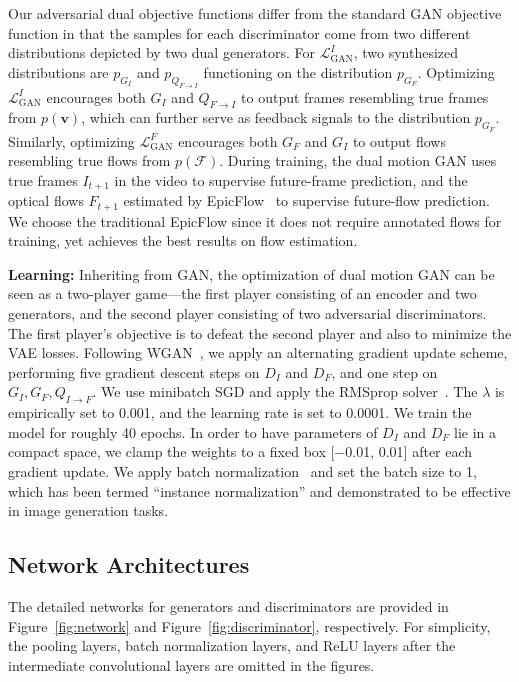 \documentclass[10pt,twocolumn,letterpaper]{article}
\begin{document}
	Our adversarial dual objective functions differ from the standard GAN objective function in that the samples for each discriminator come from two different distributions depicted by two dual generators. For $\mathcal{L}_{\text{GAN}}^I$, two synthesized distributions are $p_{G_I}$ and $p_{Q_{F\rightarrow I}}$ functioning on the distribution $p_{G_F}$. Optimizing $\mathcal{L}_{\text{GAN}}^I$ encourages both $G_I$ and $Q_{F\rightarrow I}$ to output frames resembling true frames from $p(\mathbf{v})$, which can further serve as feedback signals to the distribution $p_{G_F}$. Similarly, optimizing $\mathcal{L}_{\text{GAN}}^F$ encourages both $G_F$ and $G_I$ to output flows resembling true flows from $p(\mathcal{F})$. During training, the dual motion GAN uses true frames $I_{t+1}$ in the video to supervise future-frame prediction, and the optical flows $F_{t+1}$ estimated by EpicFlow~\cite{revaud2015epicflow} to supervise future-flow prediction. We choose the traditional EpicFlow since it does not require annotated flows for training, yet achieves the best results on flow estimation.
	
	\textbf{Learning:} Inheriting from GAN, the optimization of dual motion GAN can be seen as a two-player game---the first player consisting of an encoder and two generators, and the second player consisting of two adversarial discriminators. The first player's objective is to defeat the second player and also to minimize the VAE losses. Following WGAN~\cite{arjovsky2017wasserstein}, we apply an alternating gradient update scheme, performing five gradient descent steps on $D_I$ and $D_F$, and one step on $G_I, G_F, Q_{I\rightarrow F}$. We use minibatch SGD and apply the RMSprop solver~\cite{tieleman2012lecture}. The $\lambda$ is empirically set to 0.001, and the learning rate is set to 0.0001. We train the model for roughly 40 epochs. In order to have parameters of $D_I$ and $D_F$ lie in a compact space, we clamp the weights to a fixed box [−0.01, 0.01] after each gradient update. We apply batch normalization~\cite{ioffe2015batch} and set the batch size to 1, which has been termed ``instance normalization'' and demonstrated to be effective in image generation tasks. 
	
	\subsection{Network Architectures}
	
	The detailed networks for generators and discriminators are provided in Figure~\ref{fig:network} and Figure~\ref{fig:discriminator}, respectively. For simplicity, the pooling layers, batch normalization layers, and ReLU layers after the intermediate convolutional layers are omitted in the figures.
	
\end{document}
